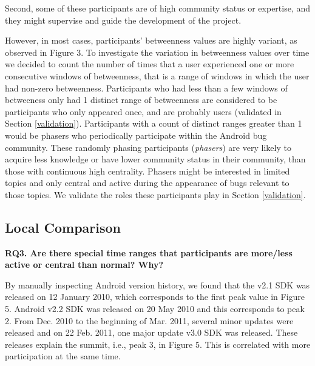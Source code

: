 \documentclass[10pt, conference, compsocconf]{IEEEtran}
\begin{document}
Second, some of these participants are of high community status or
expertise, and they might
supervise and guide the development of the 
project. 


However, in most cases, participants' betweenness values are
highly variant, as observed in Figure 3. 
To investigate the variation in betweenness values over time we
decided to count the number of times that a user experienced one or more
consecutive windows of betweenness, that is a range of windows in
which the user had non-zero betweenness.
Participants who had less than a few windows of betweeness only had 1
distinct range of betweenness are considered to be participants who
only appeared once, and are probably users (validated in Section \ref{validation}). 
Participants with a count of distinct ranges
 greater than 1 would be phasers who periodically participate within
 the Android bug
community. 
These randomly phasing participants (\emph{phasers}) are very likely to
acquire less knowledge or have lower community status in their
community, than those with continuous high centrality. 
Phasers
might be interested in limited topics and only central and active
during the appearance of bugs relevant to those topics.
We validate the roles these participants play in Section \ref{validation}.

\subsection{Local Comparison}
\label{local}

\textbf{RQ3. Are there special time ranges that participants are more/less active or central than normal? Why?}

By manually inspecting Android version history, we found that the v2.1
SDK was released on 12 January 2010, which corresponds to the first peak
value in Figure 5. Android v2.2 SDK was released on 20 May 2010 and this
corresponds to peak 2. From Dec. 2010 to the beginning of Mar. 2011,
several minor updates were released and on 22 Feb. 2011, one major
update v3.0 SDK was released. These releases explain the summit, i.e.,
peak 3, in  Figure 5. This is correlated with more participation at
the same time.
\end{document}
